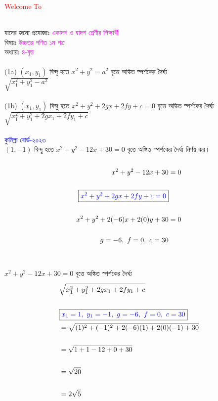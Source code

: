 \documentclass{article}
\begin{document}
 
	\Large
	\textcolor{red}{Welcome To} 
	\\
	\\
	যাদের জন্যে প্রযোজ্যঃ  	\textcolor{magenta}{একাদশ ও দ্বাদশ শ্রেণীর শিক্ষার্থী} \\
	বিষয়ঃ \textcolor{magenta}{উচ্চতর গণিত ১ম পত্র} \\
	অধ্যায়ঃ \textcolor{magenta}{৪-বৃত্ত}\\ 
	\\
	(1a) $(x_1,y_1)$ বিন্দু হতে   $x^2+y^2=a^2$  বৃত্তে অঙ্কিত স্পর্শকের দৈর্ঘ্য \\
	$\sqrt{x_1^2+y_1^2-a^2}$\\
	\\ 
	(1b) $(x_1,y_1)$ বিন্দু হতে  $x^2+y^2+2gx+2fy+c=0$  বৃত্তে অঙ্কিত স্পর্শকের দৈর্ঘ্য \\   $\sqrt{x_1^2+y_1^2+2gx_1+2fy_1+c}$\\
	\\
	\textcolor{blue}{কুমিল্লা বোর্ড-২০২৩}\\ 	
		$(1,-1)$ বিন্দু হতে  $x^2+y^2-12x+30=0$ বৃত্তে অঙ্কিত স্পর্শকের দৈর্ঘ্য নির্ণয় কর।  \\
			\\ 
			\begin{align*}
				x^2+y^2-12x+30&=0\\
				\\
				\boxed{\textcolor{blue}{x^2+y^2+2gx+2fy+c=0}}&\\
				\\
					x^2+y^2+2(-6)x+2(0)y+30&=0\\
					\\
					g=-6,\,\,f=0,\,\,c=30&
			\end{align*}
		\\
		\\
	 $x^2+y^2-12x+30=0$ বৃত্তে অঙ্কিত স্পর্শকের দৈর্ঘ্য \\ 
		\begin{align*}
	&	\sqrt{x_1^2+y_1^2+2gx_1+2fy_1+c}\\
		\\
	&	\boxed{\textcolor{blue}{x_1=1,\,\,y_1=-1,\,\,g=-6,\,\,f=0,\,\,c=30}}
		\\
			&=	\sqrt{(1)^2+(-1)^2+2(-6)(1)+2(0)(-1)+30}\\
			\\
				&=	\sqrt{1+1-12+0+30}\\
				\\
			&=	\sqrt{20}\\	
			\\
			&=2	\sqrt{5}\\		
		\end{align*}
\end{document}
